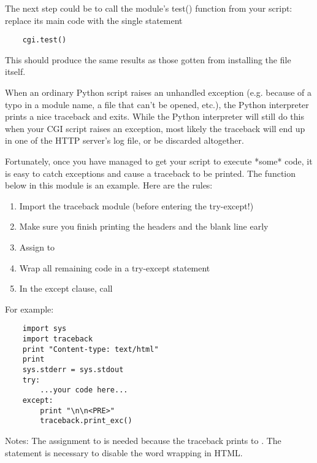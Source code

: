 The next step could be to call the  module's test() function from
your script: replace its main code with the single statement

\begin{verbatim}
	cgi.test()
\end{verbatim}
	
This should produce the same results as those gotten from installing
the  file itself.

When an ordinary Python script raises an unhandled exception
(e.g. because of a typo in a module name, a file that can't be opened,
etc.), the Python interpreter prints a nice traceback and exits.
While the Python interpreter will still do this when your CGI script
raises an exception, most likely the traceback will end up in one of
the HTTP server's log file, or be discarded altogether.

Fortunately, once you have managed to get your script to execute
*some* code, it is easy to catch exceptions and cause a traceback to
be printed.  The  function below in this module is an example.
Here are the rules:

\begin{enumerate}
	\item Import the traceback module (before entering the
	   try-except!)
	
	\item Make sure you finish printing the headers and the blank
	   line early
	
	\item Assign  to 
	
	\item Wrap all remaining code in a try-except statement
	
	\item In the except clause, call 
\end{enumerate}

For example:

\begin{verbatim}
	import sys
	import traceback
	print "Content-type: text/html"
	print
	sys.stderr = sys.stdout
	try:
		...your code here...
	except:
		print "\n\n<PRE>"
		traceback.print_exc()
\end{verbatim}

Notes: The assignment to  is needed because the traceback
prints to .  The  statement is necessary to
disable the word wrapping in HTML.

